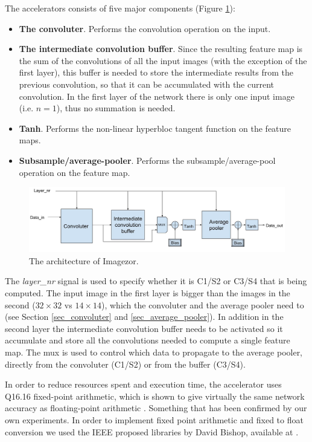 The accelerators consists of five major components (Figure \ref{fig_imagezor_architecture}):

\begin{itemize}
	\item \textbf{The convoluter}. Performs the convolution operation on the input.
	\item \textbf{The intermediate convolution buffer}. Since the resulting feature map is the sum of the convolutions of all the input images (with the exception of the first layer), this buffer is needed to store the intermediate results from the previous convolution, so that it can be accumulated with the current convolution. In the first layer of the network there is only one input image (i.e. $ n = 1 $), thus no summation is needed.
	\item \textbf{Tanh}. Performs the non-linear hyperbloc tangent function  on the feature maps.
	\item \textbf{Subsample/average-pooler}. Performs the subsample/average-pool operation on the feature map. 
\end{itemize}

\begin{figure}[h!]
	\centering
    	\includegraphics[width=1.0\textwidth]{Figures/Method/conv_layer_arch}
  	\caption{The architecture of Imagezor.}
  	\label{fig_imagezor_architecture}
\end{figure}

The \textit{layer\_nr} signal is used to specify whether it is C1/S2 or C3/S4 that is being computed. The input image in the first layer is bigger than the images in the second ($ 32 \times 32 $ vs $ 14 \times 14 $), which the convoluter and the average pooler need to  (see Section \ref{sec_convoluter} and \ref{sec_average_pooler}). In addition in the second layer the intermediate convolution buffer needs to be activated so it accumulate and store all the convolutions needed to compute a single feature map. The mux is used to control which data to propagate to the average pooler, directly from the convoluter (C1/S2) or from the buffer (C3/S4). 

In order to reduce resources spent and execution time, the accelerator uses Q16.16 fixed-point arithmetic, which is shown to give virtually the same network accuracy as floating-point arithmetic\cite{Napocensis2009} \cite{Holt1993} \cite{Chen2014}. Something that has been confirmed by our own experiments. In order to implement fixed point arithmetic and fixed to float conversion we used the IEEE proposed libraries by David Bishop, available at \cite{Bishop2015}.   

